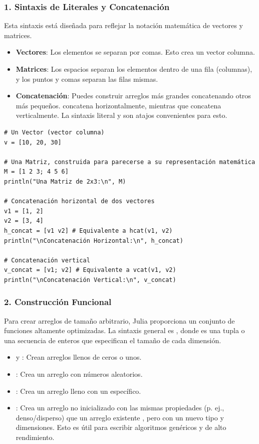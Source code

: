 \subsubsection*{1. Sintaxis de Literales y Concatenación}
Esta sintaxis está diseñada para reflejar la notación matemática de vectores y matrices.
\begin{itemize}
    \item \textbf{Vectores}: Los elementos se separan por comas. Esto crea un vector columna.
    \item \textbf{Matrices}: Los espacios separan los elementos dentro de una fila (columnas), y los puntos y comas separan las filas mismas.
    \item \textbf{Concatenación}: Puedes construir arreglos más grandes concatenando otros más pequeños.  concatena horizontalmente, mientras que  concatena verticalmente. La sintaxis literal \jcode{[A B]} y \jcode{[A; B]} son atajos convenientes para esto.
\end{itemize}

\begin{example}
\text{ }\begin{verbatim}
# Un Vector (vector columna)
v = [10, 20, 30]

# Una Matriz, construida para parecerse a su representación matemática
M = [1 2 3; 4 5 6]
println("Una Matriz de 2x3:\n", M)

# Concatenación horizontal de dos vectores
v1 = [1, 2]
v2 = [3, 4]
h_concat = [v1 v2] # Equivalente a hcat(v1, v2)
println("\nConcatenación Horizontal:\n", h_concat)

# Concatenación vertical
v_concat = [v1; v2] # Equivalente a vcat(v1, v2)
println("\nConcatenación Vertical:\n", v_concat)
\end{verbatim}
\end{example}

\subsubsection*{2. Construcción Funcional}
Para crear arreglos de tamaño arbitrario, Julia proporciona un conjunto de funciones altamente optimizadas. La sintaxis general es , donde  es una tupla o una secuencia de enteros que especifican el tamaño de cada dimensión.
\begin{itemize}
    \item {} y : Crean arreglos llenos de ceros o unos.
    \item {}: Crea un arreglo con números aleatorios.
    \item {}: Crea un arreglo lleno con un  específico.
    \item {}: Crea un arreglo no inicializado con las mismas propiedades (p. ej., denso/disperso) que un arreglo existente , pero con un nuevo tipo y dimensiones. Esto es útil para escribir algoritmos genéricos y de alto rendimiento.
\end{itemize}

